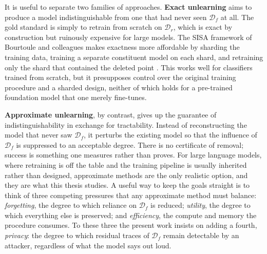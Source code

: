 \documentclass[a4paper,12pt]{report}
\begin{document}
It is useful to separate two families of approaches. \textbf{Exact unlearning} aims to produce a model indistinguishable from one that had never seen $\mathcal{D}_f$ at all. The gold standard is simply to retrain from scratch on $\mathcal{D}_r$, which is exact by construction but ruinously expensive for large models. The SISA framework of Bourtoule and colleagues makes exactness more affordable by sharding the training data, training a separate constituent model on each shard, and retraining only the shard that contained the deleted point \parencite{bourtoule2021machine}. This works well for classifiers trained from scratch, but it presupposes control over the original training procedure and a sharded design, neither of which holds for a pre-trained foundation model that one merely fine-tunes.

\textbf{Approximate unlearning}, by contrast, gives up the guarantee of indistinguishability in exchange for tractability. Instead of reconstructing the model that never saw $\mathcal{D}_f$, it perturbs the existing model so that the influence of $\mathcal{D}_f$ is suppressed to an acceptable degree. There is no certificate of removal; success is something one measures rather than proves. For large language models, where retraining is off the table and the training pipeline is usually inherited rather than designed, approximate methods are the only realistic option, and they are what this thesis studies. A useful way to keep the goals straight is to think of three competing pressures that any approximate method must balance: \emph{forgetting}, the degree to which reliance on $\mathcal{D}_f$ is reduced; \emph{utility}, the degree to which everything else is preserved; and \emph{efficiency}, the compute and memory the procedure consumes. To these three the present work insists on adding a fourth, \emph{privacy}: the degree to which residual traces of $\mathcal{D}_f$ remain detectable by an attacker, regardless of what the model says out loud.
\end{document}
